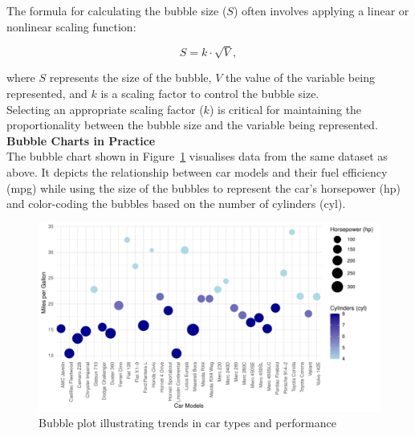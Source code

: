 \documentclass{article}\usepackage[]{graphicx}\usepackage[]{xcolor}
\makeatletter
\def\maxwidth{ %
  \ifdim\Gin@nat@width>\linewidth
    \linewidth
  \else
    \Gin@nat@width
  \fi
}
\newenvironment{knitrout}{}{} %
\makeatother
\begin{document}
\noindent
The formula for calculating the bubble size (\(S\)) often involves applying a linear or nonlinear scaling function:

\[
S = k \cdot \sqrt{V},
\]

\noindent where \(S\) represents the size of the bubble, \(V\) the value of the variable being represented, and \(k\) is a scaling factor to control the bubble size.\\

\noindent
Selecting an appropriate scaling factor (\(k\)) is critical for maintaining the proportionality between the bubble size and the variable being represented.\\

\noindent
\textbf{Bubble Charts in Practice}\\
The bubble chart shown in Figure~\ref{fig:bubble-plot} visualises data from the same dataset as above. It depicts the relationship between car models and their fuel efficiency (mpg) while using the size of the bubbles to represent the car's horsepower (hp) and color-coding the bubbles based on the number of cylinders (cyl).\\

\begin{knitrout}\scriptsize
{}\color{fgcolor}\begin{figure}[H]

{\centering \includegraphics[width=\maxwidth]{figure/beamer-bubble-plot-1} 

}

\caption[Bubble plot illustrating trends in car types and performance]{Bubble plot illustrating trends in car types and performance}\label{fig:bubble-plot}
\end{figure}

\end{knitrout}
\end{document}

